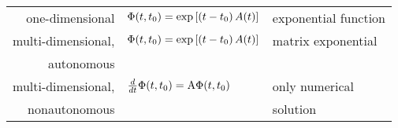 \begin{tabular}{rll}
one-dimensional & $\mathbf{\mathrm{\Phi}}(t,t_0) = \exp\left[(t-t_0)\,A(t)\right]$ & exponential function\\

multi-dimensional, & $\mathbf{\mathrm{\Phi}}(t,t_0) = \exp\left[(t-t_0)\,A(t)\right]$ & matrix exponential \\
autonomous\\

multi-dimensional, & $ \frac{d}{dt} \mathbf{\mathrm{\Phi}}(t,t_0)=\mathbf{\mathrm{A}} \mathbf{\mathrm{\Phi}}(t,t_0)$& only numerical\\
nonautonomous && solution
\end{tabular}

